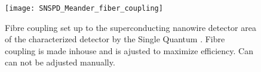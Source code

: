\begin{figure}[H]
    \centering
    \texttt{[image: SNSPD\_Meander\_fiber\_coupling]}
    \caption{Fibre coupling set up to the superconducting nanowire detector area of the characterized detector by the Single Quantum \cite{singlequantum_snsd}.
    Fibre coupling is made inhouse and is ajusted to maximize efficiency. Can can not be adjusted manually.}
    \label{fig:SNSPD_fiber_coupling}
\end{figure}

